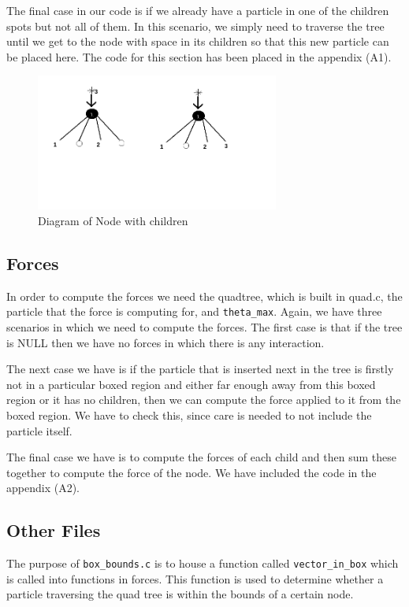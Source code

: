 \documentclass{article}
\begin{document}
The final case in our code is if we already have a particle in one of the children spots but not all of them. In this scenario, we simply need to traverse the tree until we get to the node with space in its children so that this new particle can be placed here. The code for this section has been placed in the appendix (A1).
\begin{figure}[htb]
\begin{center}
\includegraphics[width=8cm]{images/children.png}
\caption{Diagram of Node with children}
\end{center}
\end{figure}
\vspace{0.3cm}
\newpage
\subsection{Forces}
In order to compute the forces we need the quadtree, which is built in quad.c, the particle that the force is computing for, and \verb|theta_max|. Again, we have three scenarios in which we need to compute the forces. The first case is that if the tree is NULL then we have no forces in which there is any interaction.\vspace{0.3cm}

The next case we have is if the particle that is inserted next in the tree is firstly not in a particular boxed region and either far enough away from this boxed region or it has no children, then we can compute the force applied to it from the boxed region. We have to check this, since care is needed to not include the particle itself.\vspace{0.3cm}

The final case we have is to compute the forces of each child and then sum these together to compute the force of the node. We have included the code in the appendix (A2).
\subsection{Other Files}
The purpose of \verb|box_bounds.c| is to house a function called \verb|vector_in_box| which is called into functions in forces. This function is used to determine whether a particle traversing the quad tree is within the bounds of a certain node.\vspace{0.3cm}
\end{document}
